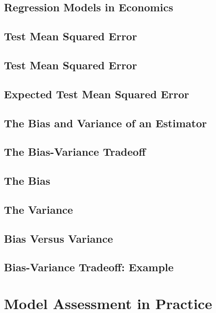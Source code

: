 \documentclass[11pt,a4paper]{article}
\begin{document}
\subsection{Regression Models in Economics}

\subsection{Test Mean Squared Error}

\subsection{Test Mean Squared Error}

\subsection{Expected Test Mean Squared Error}

\subsection{The Bias and Variance of an Estimator}

\subsection{The Bias-Variance Tradeoff}

\subsection{The Bias}

\subsection{The Variance}

\subsection{Bias Versus Variance}

\subsection{Bias-Variance Tradeoff: Example}

\section{Model Assessment in Practice}
\end{document}

